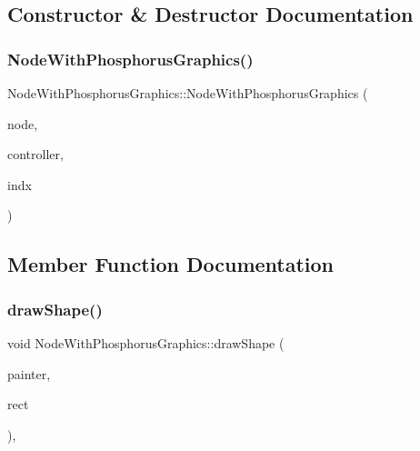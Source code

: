 \subsection{Constructor \& Destructor Documentation}
\mbox{\label{class_node_with_phosphorus_graphics_a81cef25a3d6f539e1de8b31d6b454815}} 
\subsubsection{\texorpdfstring{NodeWithPhosphorusGraphics()}{NodeWithPhosphorusGraphics()}}
{\footnotesize\ttfamily Node\+With\+Phosphorus\+Graphics\+::\+Node\+With\+Phosphorus\+Graphics (\begin{DoxyParamCaption}\item[{\mbox{\hyperlink{class_node_data}{Node\+Data}} $\ast$}]{node,  }\item[{\mbox{\hyperlink{class_map_objects_controller}{Map\+Objects\+Controller}} $\ast$}]{controller,  }\item[{int}]{indx }\end{DoxyParamCaption})\hspace{0.3cm}{\ttfamily [inline]}}



\subsection{Member Function Documentation}
\mbox{\label{class_node_with_phosphorus_graphics_abcdf09ab3438c22ffdb87a629be97a0d}} 
\subsubsection{\texorpdfstring{drawShape()}{drawShape()}}
{\footnotesize\ttfamily void Node\+With\+Phosphorus\+Graphics\+::draw\+Shape (\begin{DoxyParamCaption}\item[{Q\+Painter \&}]{painter,  }\item[{const qmapcontrol\+::\+Rect\+World\+Px \&}]{rect }\end{DoxyParamCaption})\hspace{0.3cm}{\ttfamily [protected]}, {\ttfamily [virtual]}}



